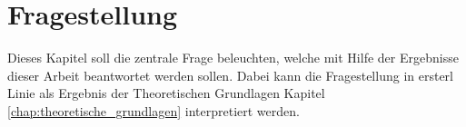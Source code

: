 \chapter{Fragestellung}
\label{chap:fragestellung} Dieses Kapitel soll die zentrale Frage beleuchten, welche
mit Hilfe der Ergebnisse dieser Arbeit beantwortet werden sollen. Dabei kann die
Fragestellung in ersterl Linie als Ergebnis der Theoretischen Grundlagen Kapitel
\ref{chap:theoretische_grundlagen} interpretiert werden.